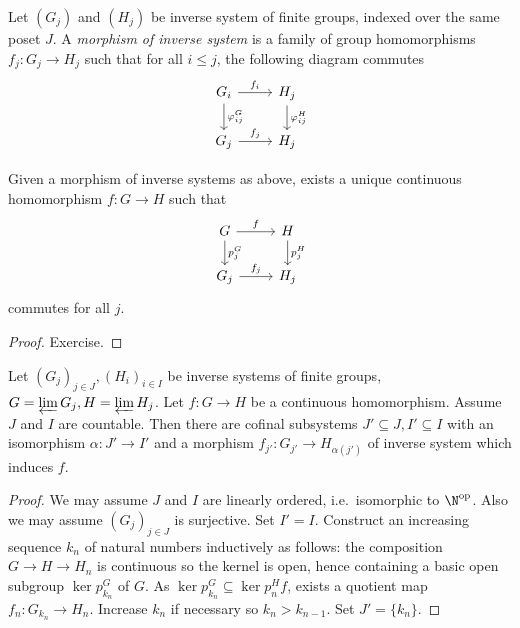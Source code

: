 \documentclass[a4paper]{article}
\begin{document}
\begin{definition}
  Let \((G_j)\) and \((H_j)\) be inverse system of finite groups, indexed over the same poset \(J\). A \emph{morphism of inverse system} is a family of group homomorphisms \(f_j: G_j \to H_j\) such that for all \(i \leq j\), the following diagram commutes
  \[
    \begin{tikzcd}
      G_i \ar[r, "f_i"] \ar[d, "\varphi_{ij}^G"] & H_j \ar[d, "\varphi_{ij}^H"] \\
      G_j \ar[r, "f_j"] & H_j
    \end{tikzcd}
  \]
\end{definition}

\begin{proposition}
  Given a morphism of inverse systems as above, exists a unique continuous homomorphism \(f: G \to H\) such that
  \[
    \begin{tikzcd}
      G \ar[r, "f"] \ar[d, "p_j^G"] & H \ar[d, "p_j^H"] \\
      G_j \ar[r, "f_j"] & H_j
    \end{tikzcd}
  \]
  commutes for all \(j\).
\end{proposition}

\begin{proof}
  Exercise.
\end{proof}

\begin{proposition}
  Let \((G_j)_{j \in J}, (H_i)_{i \in I}\) be inverse systems of finite groups, \(G = \varprojlim G_j, H = \varprojlim H_j\). Let \(f: G \to H\) be a continuous homomorphism. Assume \(J\) and \(I\) are countable. Then there are cofinal subsystems \(J' \subseteq J, I' \subseteq I\) with an isomorphism \(\alpha: J' \to I'\) and a morphism \(f_{j'}: G_{j'} \to H_{\alpha(j')}\) of inverse system which induces \(f\).
\end{proposition}

\begin{proof}
  We may assume \(J\) and \(I\) are linearly ordered, i.e.\ isomorphic to \(\N^{\text{op}}\). Also we may assume \((G_j)_{j \in J}\) is surjective. Set \(I' = I\). Construct an increasing sequence \(k_n\) of natural numbers inductively as follows: the composition \(G \to H \to H_n\) is continuous so the kernel is open, hence containing a basic open subgroup \(\ker p_{k_n}^G\) of \(G\). As \(\ker p_{k_n}^G \subseteq \ker p_n^H f\), exists a quotient map \(f_n: G_{k_n} \to H_n\). Increase \(k_n\) if necessary so \(k_n > k_{n - 1}\). Set \(J' = \{k_n\}\).
\end{proof}








\printindex
\end{document}

